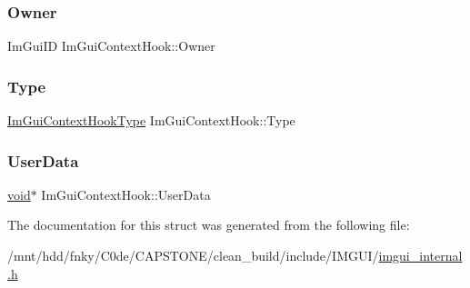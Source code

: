 \mbox{\label{structImGuiContextHook_a7b6ce62215c093535dd36c4a1303befc}} 
\subsubsection{\texorpdfstring{Owner}{Owner}}
{\footnotesize\ttfamily Im\+Gui\+ID Im\+Gui\+Context\+Hook\+::\+Owner}

\mbox{\label{structImGuiContextHook_a86f1cb04f4624448c9a508f6d299c2f9}} 
\subsubsection{\texorpdfstring{Type}{Type}}
{\footnotesize\ttfamily \hyperlink{imgui__internal_8h_a00ee5484f4006a8b98ed323d1dc37944}{Im\+Gui\+Context\+Hook\+Type} Im\+Gui\+Context\+Hook\+::\+Type}

\mbox{\label{structImGuiContextHook_a334cf9cae105a3636f13aa1f2bc25e60}} 
\subsubsection{\texorpdfstring{User\+Data}{UserData}}
{\footnotesize\ttfamily \hyperlink{imgui__impl__opengl3__loader_8h_ac668e7cffd9e2e9cfee428b9b2f34fa7}{void}$\ast$ Im\+Gui\+Context\+Hook\+::\+User\+Data}



The documentation for this struct was generated from the following file\+:\begin{DoxyCompactItemize}
\item 
/mnt/hdd/fnky/\+C0de/\+C\+A\+P\+S\+T\+O\+N\+E/clean\+\_\+build/include/\+I\+M\+G\+U\+I/\hyperlink{imgui__internal_8h}{imgui\+\_\+internal.\+h}\end{DoxyCompactItemize}
